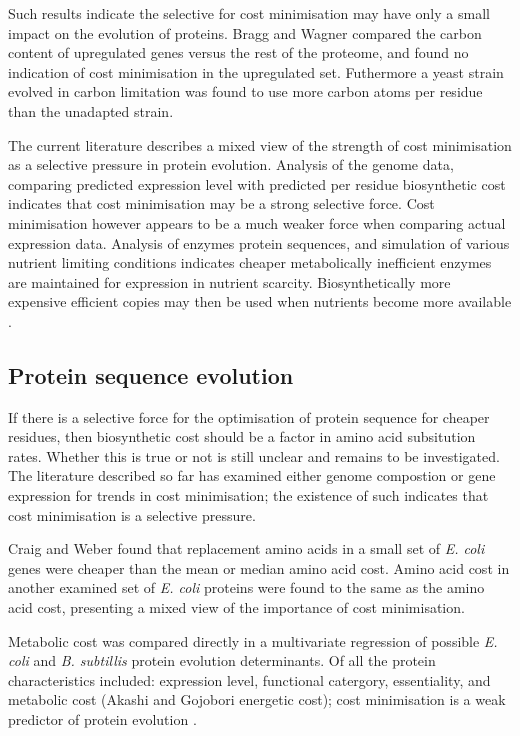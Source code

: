 Such results indicate the selective for cost minimisation may have only a small impact on the evolution of proteins. Bragg and Wagner \cite{bragg2007} compared the carbon content of upregulated genes versus the rest of the proteome, and found no indication of cost minimisation in the upregulated set. Futhermore a yeast strain evolved in carbon limitation was found to use more carbon atoms per residue than the unadapted strain.

The current literature describes a mixed view of the strength of cost minimisation as a selective pressure in protein evolution. Analysis of the genome data, comparing predicted expression level with predicted per residue biosynthetic cost indicates that cost minimisation may be a strong selective force. Cost minimisation however appears to be a much weaker force when comparing actual expression data. Analysis of enzymes protein sequences, and simulation of various nutrient limiting conditions indicates cheaper metabolically inefficient enzymes are maintained for expression in nutrient scarcity. Biosynthetically more expensive efficient copies may then be used when nutrients become more available \cite{carlson2007}.

\subsection{Protein sequence evolution}

If there is a selective force for the optimisation of protein sequence for cheaper residues, then biosynthetic cost should be a factor in amino acid subsitution rates. Whether this is true or not is still unclear and remains to be investigated. The literature described so far has examined either genome compostion or gene expression for trends in cost minimisation; the existence of such indicates that cost minimisation is a selective pressure.

Craig and Weber \cite{craig1998} found that replacement amino acids in a small set of \emph{E. coli} genes were cheaper than the mean or median amino acid cost. Amino acid cost in another examined set of \emph{E. coli} proteins were found to the same as the amino acid cost, presenting a mixed view of the importance of cost minimisation.

Metabolic cost was compared directly in a multivariate regression of possible \emph{E. coli} and \emph{B. subtillis} protein evolution determinants. Of all the protein characteristics included: expression level, functional catergory, essentiality, and metabolic cost (Akashi and Gojobori energetic cost\cite{akashi2002}); cost minimisation is a weak predictor of protein evolution \cite{rocha2004}.


